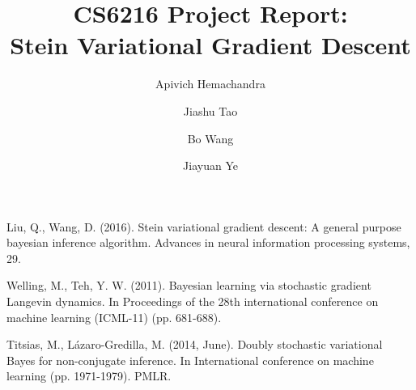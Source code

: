 \documentclass[runningheads]{llncs}
\begin{document}
%
\title{CS6216 Project Report: \\Stein Variational Gradient Descent}
%
%
\author{Apivich Hemachandra \and
Jiashu Tao \and
Bo Wang   \and
Jiayuan Ye }
%
%

\maketitle              %
%







%
%
%
% 
% 
%
\begin{thebibliography}{8}
Liu, Q., Wang, D. (2016). Stein variational gradient descent: A general purpose bayesian inference algorithm. Advances in neural information processing systems, 29.

Welling, M., Teh, Y. W. (2011). Bayesian learning via stochastic gradient Langevin dynamics. In Proceedings of the 28th international conference on machine learning (ICML-11) (pp. 681-688).

Titsias, M., Lázaro-Gredilla, M. (2014, June). Doubly stochastic variational Bayes for non-conjugate inference. In International conference on machine learning (pp. 1971-1979). PMLR.

\end{thebibliography}

\appendix


\end{document}
